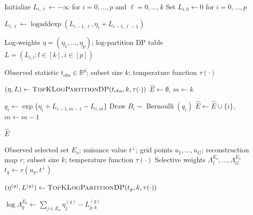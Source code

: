 \documentclass[12pt]{article}
\newcommand{\nbracket}[1]{\left( #1 \right)}
\begin{document}
\begin{appendices}
\begin{algorithm}[H]
\begin{algorithmic}[1]
\State Initialize $L_{i,\ell}\gets -\infty$ for $i=0,\ldots,p$ and $\ell=0,\ldots,k$
\State Set $L_{i,0}\gets 0$ for $i=0,\ldots,p$

        \State
        $L_{i,\ell}
        \gets
        \operatorname{logaddexp}
        \left(
          L_{i-1,\ell},
          \eta_i + L_{i-1,\ell-1}
        \right)$
    \EndFor
\EndFor

\State \Return Log-weights $\eta=(\eta_1,\ldots,\eta_p)$; log-partition DP table $L=\nbracket{L_{i,l}: l \in [k], i\in[p]}$ 
\end{algorithmic}
\end{algorithm}



\begin{algorithm}[H]
\caption{Exact sampling from the randomized top-$k$ rule}
\label{alg:exact_randomized_topk_sampler}
\begin{algorithmic}[1]
\Require Observed statistic $t_{\mathrm{obs}}\in\mathbb R^p$; subset size $k$; temperature function $\tau(\cdot)$

\State $(\eta,L)\gets \textsc{TopKLogPartitionDP}(t_{\mathrm{obs}},k,\tau(\cdot))$
\State $\widehat E\gets\emptyset$, \quad $m\gets k$

    \State $q_i \gets
    \exp\{\eta_i+L_{i-1,m-1}-L_{i,m}\}$
    \State Draw $B_i\sim\operatorname{Bernoulli}(q_i)$
        \State $\widehat E\gets \widehat E\cup\{i\}$, \quad $m\gets m-1$
    \EndIf
\EndFor

\State \Return $\widehat E$
\end{algorithmic}
\end{algorithm}



\begin{algorithm}[H]
\caption{\textsc{SelectiveWeightsOnGrid}: selective weights on a quadrature grid}
\label{alg:selective_weights_grid}
\begin{algorithmic}[1]
\Require Observed selected set $E_o$; nuisance value $t^\perp$; grid points $u_1,\ldots,u_G$; reconstruction map $r$; subset size $k$; temperature function $\tau(\cdot)$
\Ensure Selective weights 
$\Lambda^{E_o}_1,\ldots,\Lambda^{E_o}_G$
    \State $t_g \gets r(u_g,t^\perp)$

    \State
    $(\eta^{(g)},L^{(g)})
    \gets \textsc{TopKLogPartitionDP}(t_g,k,\tau(\cdot))$ 

    \State
    $\log \Lambda^{E_o}_g
    \gets
    \displaystyle
    \sum_{j\in E_o}\eta^{(g)}_j
    -
    L^{(g)}_{p,k}$


\end{algorithmic}
\end{algorithm}
\end{appendices}
\end{document}
